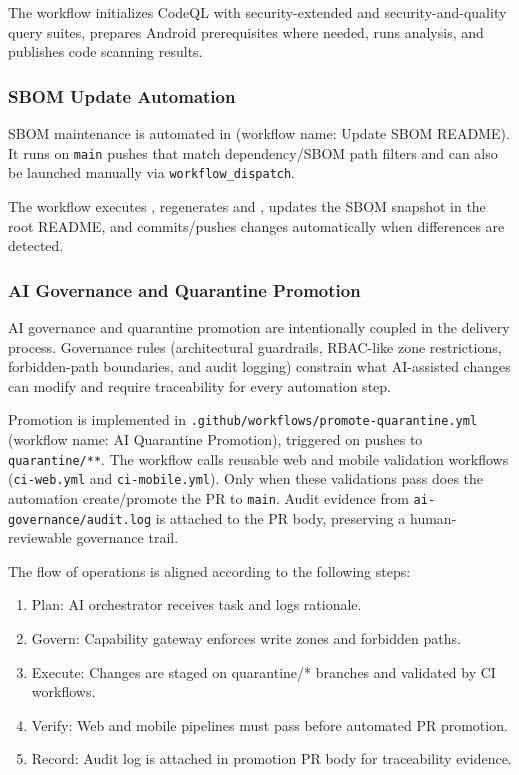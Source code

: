 \documentclass[12pt,a4paper]{article}
\begin{document}
The workflow initializes CodeQL with security-extended and
security-and-quality query suites, prepares Android prerequisites where
needed, runs analysis, and publishes code scanning results.

\subsubsection{SBOM Update Automation}
SBOM maintenance is automated in
 (workflow name: Update SBOM
README). It runs on \texttt{main} pushes that match dependency/SBOM path
filters and can also be launched manually via \texttt{workflow\_dispatch}.

The workflow executes , regenerates
 and
, updates the SBOM snapshot in the root
README, and commits/pushes changes automatically when differences are detected.

\subsubsection{AI Governance and Quarantine Promotion}
AI governance and quarantine promotion are intentionally coupled in the
delivery process. Governance rules (architectural guardrails, RBAC-like zone
restrictions, forbidden-path boundaries, and audit logging) constrain what
AI-assisted changes can modify and require traceability for every automation
step.

Promotion is implemented in
\texttt{.github/workflows/promote-quarantine.yml} (workflow name: AI
Quarantine Promotion), triggered on pushes to
\texttt{quarantine/**}. The workflow calls reusable web and mobile validation
workflows (\texttt{ci-web.yml} and \texttt{ci-mobile.yml}). Only when these
validations pass does the automation create/promote the PR to
\texttt{main}. Audit evidence from \texttt{ai-governance/audit.log} is attached
to the PR body, preserving a human-reviewable governance trail.

The flow of operations is aligned according to the following steps:
\begin{enumerate}[leftmargin=*]
    \item Plan: AI orchestrator receives task and logs rationale.
    \item Govern: Capability gateway enforces write zones and forbidden paths.
    \item Execute: Changes are staged on quarantine/* branches and validated by
    CI workflows.
    \item Verify: Web and mobile pipelines must pass before automated PR
    promotion.
    \item Record: Audit log is attached in promotion PR body for traceability
    evidence.
\end{enumerate}
\end{document}
